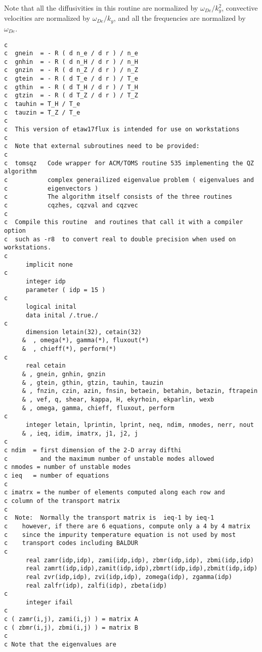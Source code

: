 Note that all the diffusivities in this routine are normalized by
$ \omega_{De} / k_y^2 $,
convective velocities are normalized by $ \omega_{De} / k_y $,
and all the frequencies are normalized by $ \omega_{De} $.
\begin{verbatim}
c
c  gnein  = - R ( d n_e / d r ) / n_e
c  gnhin  = - R ( d n_H / d r ) / n_H
c  gnzin  = - R ( d n_Z / d r ) / n_Z
c  gtein  = - R ( d T_e / d r ) / T_e
c  gthin  = - R ( d T_H / d r ) / T_H
c  gtzin  = - R ( d T_Z / d r ) / T_Z
c  tauhin = T_H / T_e
c  tauzin = T_Z / T_e
c
c  This version of etaw17flux is intended for use on workstations
c
c  Note that external subroutines need to be provided:
c
c  tomsqz   Code wrapper for ACM/TOMS routine 535 implementing the QZ algorithm
c           complex generailized eigenvalue problem ( eigenvalues and 
c           eigenvectors ) 
c           The algorithm itself consists of the three routines 
c           cqzhes, cqzval and cqzvec
c
c  Compile this routine  and routines that call it with a compiler option 
c  such as -r8  to convert real to double precision when used on workstations.
c
      implicit none
c
      integer idp
      parameter ( idp = 15 )
c
      logical inital
      data inital /.true./
c
      dimension letain(32), cetain(32)
     &  , omega(*), gamma(*), fluxout(*)
     &  , chieff(*), perform(*)
c
      real cetain
     & , gnein, gnhin, gnzin
     & , gtein, gthin, gtzin, tauhin, tauzin
     & , fnzin, czin, azin, fnsin, betaein, betahin, betazin, ftrapein
     & , vef, q, shear, kappa, H, ekyrhoin, ekparlin, wexb
     & , omega, gamma, chieff, fluxout, perform
c
      integer letain, lprintin, lprint, neq, ndim, nmodes, nerr, nout
     & , ieq, idim, imatrx, j1, j2, j
c
c ndim  = first dimension of the 2-D array difthi
c         and the maximum number of unstable modes allowed
c nmodes = number of unstable modes
c ieq   = number of equations
c
c imatrx = the number of elements computed along each row and
c column of the transport matrix
c
c  Note:  Normally the transport matrix is  ieq-1 by ieq-1
c    however, if there are 6 equations, compute only a 4 by 4 matrix
c    since the impurity temperature equation is not used by most
c    transport codes including BALDUR
c
      real zamr(idp,idp), zami(idp,idp), zbmr(idp,idp), zbmi(idp,idp)
      real zamrt(idp,idp),zamit(idp,idp),zbmrt(idp,idp),zbmit(idp,idp)
      real zvr(idp,idp), zvi(idp,idp), zomega(idp), zgamma(idp)
      real zalfr(idp), zalfi(idp), zbeta(idp)
c
      integer ifail
c
c ( zamr(i,j), zami(i,j) ) = matrix A
c ( zbmr(i,j), zbmi(i,j) ) = matrix B
c
c Note that the eigenvalues are

\end{verbatim}
